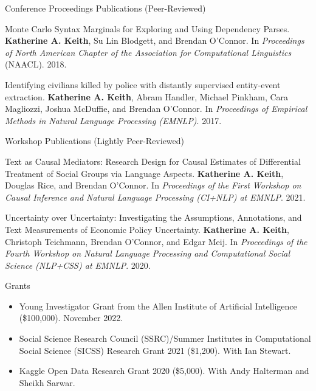 \documentclass{resume} %
\begin{document}
\begin{rSection}{Conference Proceedings Publications (Peer-Reviewed)}
\begin{etaremune}
\item Monte Carlo Syntax Marginals for Exploring and Using Dependency Parses.
\textbf{Katherine A. Keith}, Su Lin Blodgett, and Brendan O'Connor.
In \emph{Proceedings of North American Chapter of the Association for Computational Linguistics} (NAACL). 2018.

\item Identifying civilians killed by police with distantly supervised entity-event extraction. 
\textbf{Katherine A. Keith}, Abram Handler, Michael Pinkham, Cara Magliozzi, Joshua McDuffie, and Brendan O'Connor. In \emph{Proceedings of Empirical Methods in Natural Language Processing (EMNLP)}. 2017. 

\end{etaremune}
\end{rSection}

\begin{rSection}{Workshop Publications (Lightly Peer-Reviewed)}
\begin{etaremune}
\item Text as Causal Mediators: Research Design for Causal Estimates of Differential Treatment of Social Groups via Language Aspects. \textbf{Katherine A. Keith}, Douglas Rice, and Brendan O'Connor. In \emph{Proceedings of the First Workshop on Causal Inference and Natural Language Processing (CI+NLP) at EMNLP}. 2021.  

\item Uncertainty over Uncertainty: Investigating the Assumptions, Annotations, and Text Measurements of Economic Policy Uncertainty. \textbf{Katherine A. Keith}, Christoph Teichmann, Brendan O’Connor, and Edgar Meij.  In \emph{Proceedings of the Fourth Workshop on Natural Language Processing and Computational Social Science (NLP+CSS) at EMNLP}. 2020.

\end{etaremune}
\end{rSection}

\begin{rSection}{Grants}
\begin{itemize}
\item Young Investigator Grant from the Allen Institute of Artificial Intelligence (\$100,000). November 2022. 
\item  Social Science Research Council (SSRC)/Summer Institutes in Computational Social Science (SICSS) Research Grant 2021 (\$1,200). With Ian Stewart. 
\item  Kaggle Open Data Research Grant 2020 (\$5,000). With Andy Halterman and Sheikh Sarwar.
\end{itemize}

\end{rSection}
\end{document}
